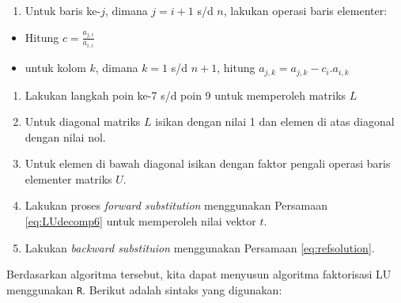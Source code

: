 \documentclass[]{book}
\providecommand{\tightlist}{%
  \setlength{\itemsep}{0pt}\setlength{\parskip}{0pt}}
\theoremstyle{definition}
\theoremstyle{definition}
\theoremstyle{definition}
\theoremstyle{remark}
\begin{document}
\begin{enumerate}
\def\labelenumi{\arabic{enumi}.}
\setcounter{enumi}{4}
\tightlist
\item
  Untuk baris ke-\(j\), dimana \(j=i+1\) s/d \(n\), lakukan operasi baris elementer:
\end{enumerate}

\begin{itemize}
\tightlist
\item
  Hitung \(c=\frac{a_{j,i}}{a_{i,i}}\)
\item
  untuk kolom \(k\), dimana \(k=1\) s/d \(n+1\), hitung \(a_{j,k}=a_{j,k}-c_i.a_{i,k}\)
\end{itemize}

\begin{enumerate}
\def\labelenumi{\arabic{enumi}.}
\setcounter{enumi}{5}
\tightlist
\item
  Lakukan langkah poin ke-7 s/d poin 9 untuk memperoleh matriks \(L\)
\item
  Untuk diagonal matriks \(L\) isikan dengan nilai 1 dan elemen di atas diagonal dengan nilai nol.
\item
  Untuk elemen di bawah diagonal isikan dengan faktor pengali operasi baris elementer matriks \(U\).
\item
  Lakukan proses \emph{forward substitution} menggunakan Persamaan \eqref{eq:LUdecomp6} untuk memperoleh nilai vektor \(t\).
\item
  Lakukan \emph{backward substituion} menggunakan Persamaan \eqref{eq:refsolution}.
\end{enumerate}

Berdasarkan algoritma tersebut, kita dapat menyusun algoritma faktorisasi LU menggunakan \texttt{R}. Berikut adalah sintaks yang digunakan:
\end{document}
